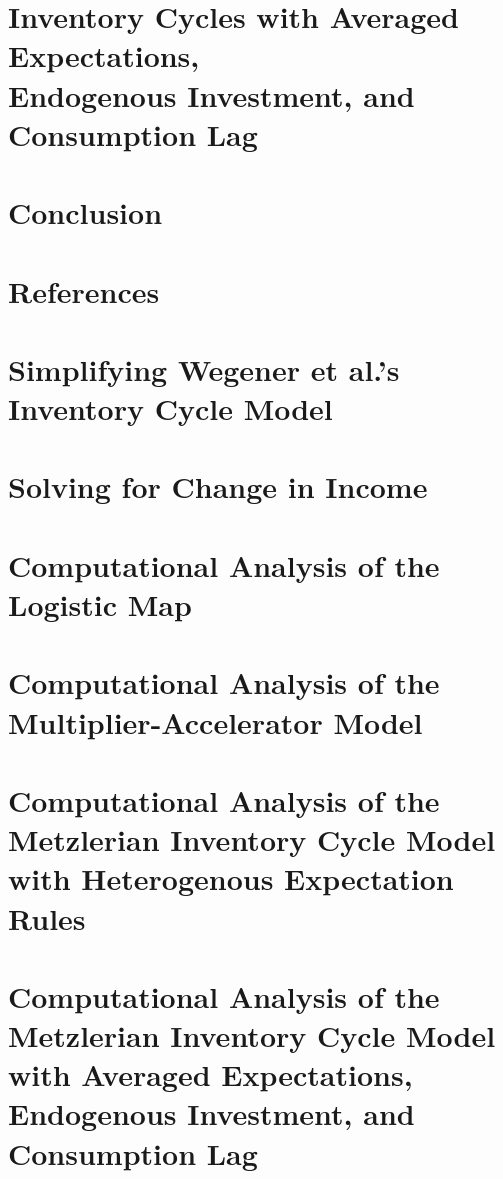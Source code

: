 \documentclass[12pt,twoside]{report}
\begin{document}
\chapter{Inventory Cycles with Averaged Expectations,\\ Endogenous Investment, and Consumption Lag}\label{ch:metzlerian-expanded}

\chapter{Conclusion}

\chapter{References}

\begin{appendices}
\chapter{Simplifying Wegener et al.'s Inventory Cycle Model}\label{appendix_metzler}

\chapter{Solving for Change in Income}\label{appendix_growth}

\chapter{Computational Analysis of the Logistic Map}

\chapter{Computational Analysis of the\\ Multiplier-Accelerator Model}

\chapter{Computational Analysis of the Metzlerian Inventory Cycle Model with Heterogenous Expectation Rules}

\chapter{Computational Analysis of the Metzlerian Inventory Cycle Model with Averaged Expectations, Endogenous Investment, and Consumption Lag}
	
\end{appendices}
\end{document}
